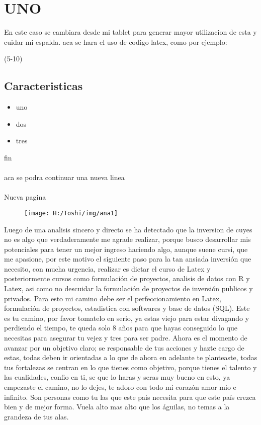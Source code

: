 \section{UNO}
   En este caso se cambiara desde mi tablet para generar mayor utilizacion de esta y cuidar mi espalda.
			aca se hara el uso de codigo latex, como por ejemplo:

\lipsum(5-10)

\subsection{Caracteristicas}
\begin{itemize}
\item uno
\item dos
\item tres
\end{itemize}
fin\\
\\
aca se podra continuar una nueva linea\\
\\
\newpage
Nueva pagina
\begin{figure}
   \centering
   \texttt{[image: H:/Toshi/img/ana1]}
\end{figure}

Luego de una analisis sincero y directo se ha detectado que la inversion de cuyes no es algo que verdaderamente me agrade realizar, porque busco desarrollar mis potenciales para tener un mejor ingreso haciendo algo, aunque suene cursi, que me apasione, por este motivo el siguiente paso para la tan ansiada inversión que necesito, con mucha urgencia, realizar es dictar el curso de Latex y posteriormente cursos como formulación de proyectos, analisis de datos con R y Latex, asi como no descuidar la formulación de proyectos de inversión publicos y privados. Para esto mi camino debe ser el perfeccionamiento en Latex, formulación de proyectos, estadistica con softwares y base de datos (SQL). Este es tu camino, por favor tomatelo en serio, ya estas viejo para estar divagando y perdiendo el tiempo, te queda solo 8 años para que hayas conseguido lo que necesitas para asegurar tu vejez y tres para ser padre. Ahora es el momento de avanzar por un objetivo claro; se responsable de tus acciones y hazte cargo de estas, todas deben ir orientadas a lo que de ahora en adelante te planteaste, todas tus fortalezas se centran en lo que tienes como objetivo,  porque tienes el talento y las cualidades, confio en ti, se que lo haras y seras muy bueno en esto, ya empezaste el camino, no lo dejes, te adoro con todo mi corazón amor mio e infinito. Son personas como tu las que este pais necesita para que este país crezca bien y de mejor forma. Vuela alto mas alto que los águilas, no temas a la grandeza de tus alas.

